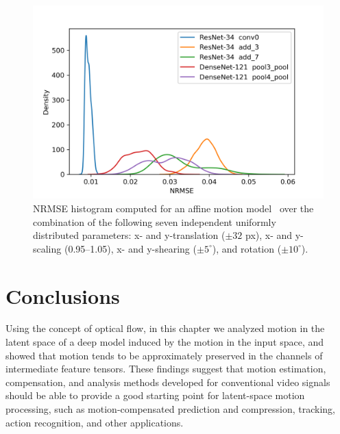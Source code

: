 \begin{figure}[htbp]
    \centering
    \includegraphics[width=\linewidth]{img/video_latent_space_motion_analysis/nrmse/random.png}
    \caption[NRMSE distribution for random transformations]{%
        NRMSE histogram computed for an affine motion model~\cite{wang_etal_2002} over the combination of the following seven independent uniformly distributed parameters: x- and y-translation ($\pm 32$ px), x- and y-scaling (0.95--1.05), x- and y-shearing ($\pm 5^{\circ}$), and rotation ($\pm 10^{\circ}$).%
    }
    \label{fig:video_latent_space_motion_analysis/mse/histogram}
\end{figure}




\section{Conclusions}
\label{sec:video_latent_space_motion_analysis/conclusions}
Using the concept of optical flow, in this chapter we analyzed motion in the latent space of a deep model induced by the motion in the input space, and showed that motion tends to be approximately preserved in the channels of intermediate feature tensors. These findings suggest that motion estimation, compensation, and analysis methods developed for conventional video signals should be able to provide a good starting point for latent-space motion processing, such as motion-compensated prediction and compression, tracking, action recognition, and other applications.

